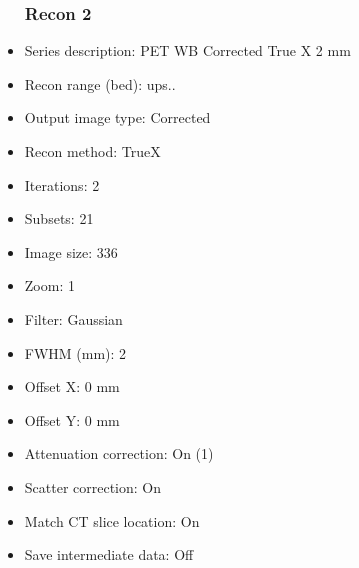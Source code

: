 \documentclass[12pt]{article}
\begin{document}
\begin{itemize}
\subsubsection{Recon 2}
\item Series description: PET WB Corrected True X 2 mm
\item Recon range (bed): ups..
\item Output image type: Corrected
\item Recon method: TrueX
\item Iterations: 2
\item Subsets: 21
\item Image size: 336
\item Zoom: 1
\item Filter: Gaussian
\item FWHM (mm): 2
\item Offset X: 0 mm
\item Offset Y: 0 mm
\item Attenuation correction: On (1)
\item Scatter correction: On
\item Match CT slice location: On
\item Save intermediate data: Off
\end{itemize}
\end{document}
